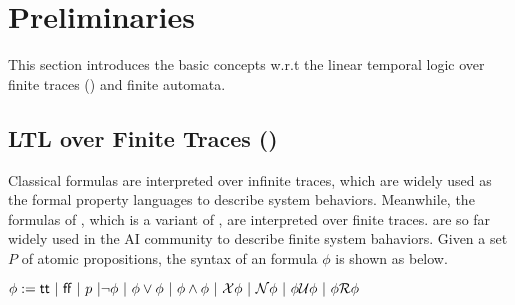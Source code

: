 \section{Preliminaries} \label{sec:pre}
This section introduces the basic concepts w.r.t the linear temporal logic over finite traces (\ltlf) and finite automata. 
\subsection{LTL over Finite Traces (\ltlf)}
Classical \ltl formulas are interpreted over infinite traces, which are widely used as the formal property languages to describe system behaviors. Meanwhile, the formulas of \ltlf, which is a variant of \ltl, are interpreted over finite traces. \ltlf are so far widely used in the AI community to describe finite system bahaviors. Given a set $P$ of atomic propositions, the syntax of an \ltlf formula $\phi$ is shown as below.

\begin{center}  
$\phi:=\tt\ |\ \ff\ |\ p\ |\neg\phi\ |\ \phi \vee \phi\ |\ \phi \wedge \phi\ |\ \X \phi\ |\ \N \phi\ |\ \phi \U \phi\ |\ \phi \R \phi$ 
\end{center}

